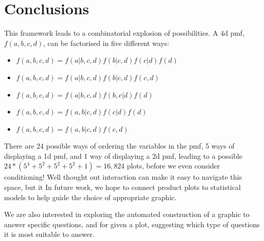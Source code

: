 \documentclass[journal]{vgtc}
\begin{document}
% 
% 
% 
% 

\section{Conclusions}

This framework leads to a combinatorial explosion of possibilities. A 4d {\sc pmf}, $f(a, b, c, d)$, can be factorised in five different ways:

\begin{itemize}
  \setlength{\itemsep}{0em}
  
  \item $f(a, b, c, d) = f(a | b, c, d) f(b | c, d) f(c | d) f(d)$
  \item $f(a, b, c, d) = f(a | b, c, d) f(b | c, d) f(c, d)$
  \item $f(a, b, c, d) = f(a | b, c, d) f(b, c | d) f(d)$
  \item $f(a, b, c, d) = f(a, b | c, d) f(c | d) f(d)$
  \item $f(a, b, c, d) = f(a, b | c, d) f(c, d)$
\end{itemize}

\noindent There are 24 possible ways of ordering the variables in the {\sc pmf}, 5 ways of displaying a 1d {\sc pmf}, and 1 way of displaying a 2d {\sc pmf}, leading to a possible $24 * (5^4 + 5^2 + 5^2 + 5^2 + 1) = 16,824$ plots, before we even consider conditioning! Well thought out interaction can make it easy to navigate this space, but it In future work, we hope to connect product plots to statistical models to help guide the choice of appropriate graphic.

We are also interested in exploring the automated construction of a graphic to answer specific questions, and for given a plot, suggesting which type of questions it is most suitable to answer.




\end{document}
